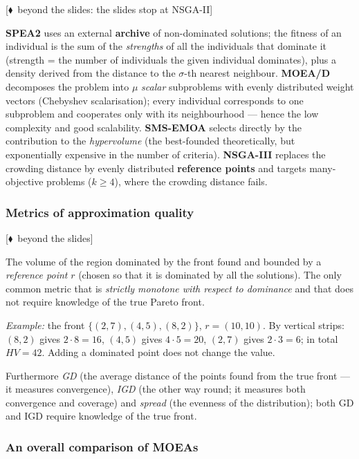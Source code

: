 \documentclass[11pt,a4paper]{article}
\theoremstyle{definition}
\newcommand{\mimo}{\textcolor{markcol}{\textsf{\footnotesize[$\blacklozenge$~beyond the slides]}}}
\newcommand{\mimoq}[1]{\textcolor{markcol}{\textsf{\footnotesize[$\blacklozenge$~beyond the slides: #1]}}}
\begin{document}
\noindent\mimoq{the slides stop at NSGA-II}

\textbf{SPEA2} uses an external \textbf{archive} of non-dominated solutions; the fitness of
an individual is the sum of the \emph{strengths} of all the individuals that dominate it
(strength = the number of individuals the given individual dominates), plus a density derived
from the distance to the $\sigma$-th nearest neighbour.
\textbf{MOEA/D} decomposes the problem into $\mu$ \emph{scalar} subproblems with evenly
distributed weight vectors (Chebyshev scalarisation); every individual corresponds to one
subproblem and cooperates only with its neighbourhood --- hence the low complexity and good
scalability. \textbf{SMS-EMOA} selects directly by the contribution to the
\emph{hypervolume} (the best-founded theoretically, but exponentially expensive in the number
of criteria). \textbf{NSGA-III} replaces the crowding distance by evenly distributed
\textbf{reference points} and targets many-objective problems ($k \ge 4$), where the crowding
distance fails.

\subsubsection{Metrics of approximation quality}

\noindent\mimo{}

\begin{defbox}
The volume of the region dominated by the front found and bounded by a \emph{reference point}
$r$ (chosen so that it is dominated by all the solutions). The only common metric that is
\emph{strictly monotone with respect to dominance} and that does not require knowledge of the
true Pareto front.

\emph{Example:} the front $\{(2,7), (4,5), (8,2)\}$, $r = (10,10)$. By vertical strips:
$(8,2)$ gives $2\cdot8 = 16$, $(4,5)$ gives $4\cdot5 = 20$, $(2,7)$ gives $2\cdot3 = 6$;
in total $HV = 42$. Adding a dominated point does not change the value.
\end{defbox}

Furthermore \emph{GD} (the average distance of the points found from the true front --- it
measures convergence), \emph{IGD} (the other way round; it measures both convergence and
coverage) and \emph{spread} (the evenness of the distribution); both GD and IGD require
knowledge of the true front.

\subsubsection{An overall comparison of MOEAs}
\end{document}
